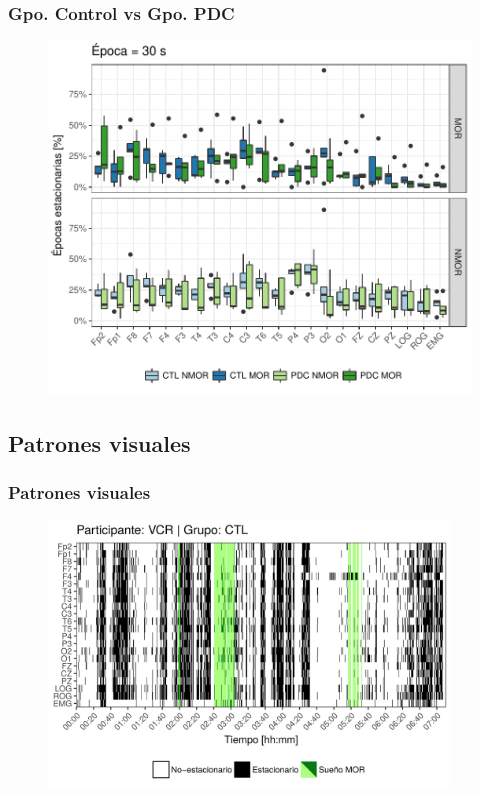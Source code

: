 \documentclass[serif,mathserif,professionalfont]{beamer}
\begin{document}
\begin{frame}\frametitle{Gpo. Control vs Gpo. PDC}
\begin{figure}
\centering
\includegraphics[width=0.8\linewidth]
{./img_art_dfa/Comparacion_gpos_MOR_NMOR_v3.pdf} 
\end{figure}
\end{frame}

\subsection{Patrones visuales}

\begin{frame}\frametitle{Patrones visuales}
\begin{figure}
\includegraphics[width=0.95\textwidth]
{./img_art_dfa/zoom_noVCR_v2.png}
\end{figure}
\end{frame}
\end{document}
